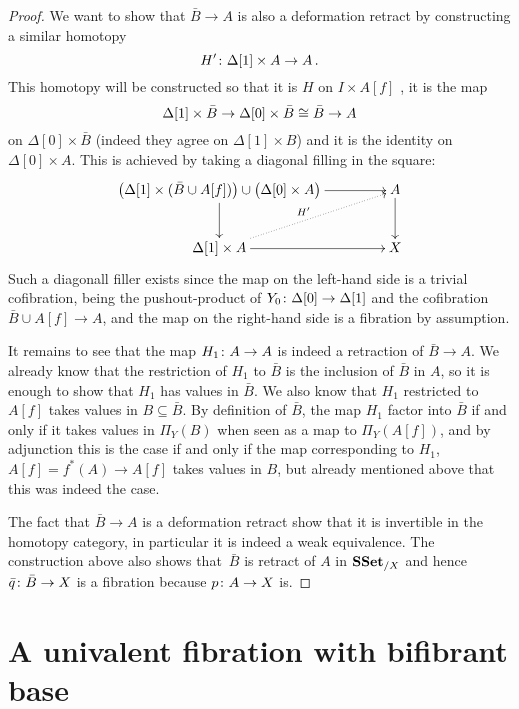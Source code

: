 \documentclass[reqno,10pt,a4paper,oneside,draft]{amsart}
\begin{document}
\begin{proof}
We want to show that $\bar{B} \rightarrow A$ is also a deformation retract by constructing a similar homotopy 
\[
H' \colon \Delta[1] \times A \rightarrow A \, .
\] 
This homotopy will be constructed so that it is $H$ on $I \times A[f]$ ,  it is the map 
\[
\Delta[1] \times \bar{B} \rightarrow \Delta[0]  \times \bar{B} \cong \bar{B} \rightarrow A
\] 
on $\Delta[0] \times \bar{B} $ (indeed they agree on $\Delta[1] \times B$) and it is the identity on $\Delta[0] \times A$.  This is achieved by taking a diagonal filling in the square:
\[
\xymatrix@C=1.5cm{
\big( \Delta[1] \times (\bar{B} \cup A[f]) \big)  \cup \big( \Delta[0] \times A \big) \ar[d] \ar[r] & A \ar[d] \\
\Delta[1] \times A \ar[r] \ar@{.>}[ur]^{H'} & X
}\]
Such a diagonall filler exists since the map on the left-hand side is a trivial cofibration, being the 
 pushout-product of $Y_0 \colon \Delta[0] \rightarrow \Delta[1]$ and the cofibration $\bar{B} \cup A[f] \rightarrow A$, and the map on the right-hand side is a fibration by assumption.

It remains to see that the map $H_{1} \colon A \rightarrow A$ is indeed a retraction of $\bar{B} \rightarrow A$. We already know that the restriction of $H_{1}$ to $\bar{B}$ is  the inclusion of $\bar{B}$ in $A$, so it is enough to show that $H_{1}$ has values in $\bar{B}$. We also know that $H_{1}$ restricted to $A[f]$ takes values in $B \subseteq \bar{B}$. By definition of $\bar{B}$, the map $H_1$ factor into $\bar{B}$ if and only if it takes values in $\Pi_Y(B)$ when seen as a map to $\Pi_Y(A[f])$, and by adjunction this is the case if and only if the map corresponding to $H_1$, $A[f]= f^*(A) \rightarrow A[f]$ takes values in $B$, but already mentioned above that this was indeed the case.

The fact that $\bar{B} \rightarrow A$ is a deformation retract show that it is invertible in the homotopy category, in particular it is indeed a weak equivalence. The construction above also shows that~$\bar{B}$ is retract of $A$ in $\mathbf{SSet}_{/X}$ and hence $\bar{q} \colon \bar{B} \rightarrow X$ is a fibration because $p \colon A \rightarrow X$ is.
\end{proof}

 

\section{A univalent  fibration with bifibrant base}
\end{document}
